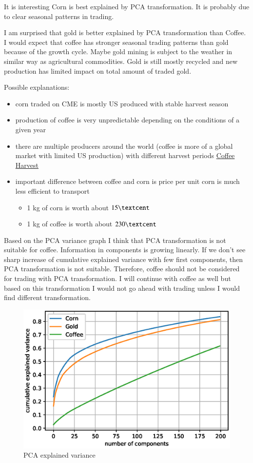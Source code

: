 \documentclass[final,2p]{elsarticle}
\begin{document}
It is interesting Corn is best explained by PCA transformation. It is probably due to clear seasonal patterns in trading.

I am surprised that gold is better explained by PCA transformation than Coffee. I would expect that coffee has stronger seasonal trading patterns than gold because of the growth cycle. Maybe gold mining is subject to the weather in similar way as agricultural commodities. Gold is still mostly recycled and new production has limited impact on total amount of traded gold.

Possible explanations:
\begin{itemize}
    \item corn traded on CME is mostly US produced with stable harvest season
    \item production of coffee is very unpredictable depending on the conditions of a given year
    \item there are multiple producers around the world (coffee is more of a global market with limited US production) with different harvest periods \href{https://driftaway.coffee/when-is-coffee-harvested/}{Coffee Harvest}
    \item important difference between coffee and corn is price per unit corn is much less efficient to transport
        \begin{itemize}
            \item 1 kg of corn is worth about $15\textcent$
            \item 1 kg of coffee is worth about $230\textcent$
        \end{itemize}
\end{itemize}
    
Based on the PCA variance graph I think that PCA transformation is not suitable for coffee. Information in components is growing linearly. If we don't see sharp increase of cumulative explained variance with few first components, then PCA transformation is not suitable. Therefore, coffee should not be considered for trading with PCA transformation. I will continue with coffee as well but based on this transformation I would not go ahead with trading unless I would find different transformation.
\begin{figure}[h]
    \centering
    \includegraphics{figures/pca.eps}
    \caption{PCA explained variance}
\end{figure}
\end{document}
